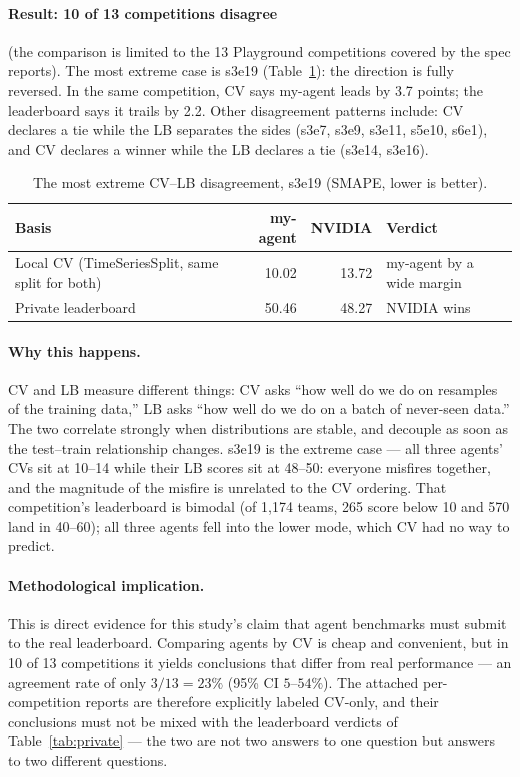 \documentclass[11pt,a4paper]{article}
\begin{document}
\paragraph{Result: 10 of 13 competitions disagree} (the comparison is limited to the 13 Playground competitions covered by the spec reports). The most extreme case is s3e19 (Table~\ref{tab:cvlb}): the direction is fully reversed. In the same competition, CV says my-agent leads by 3.7 points; the leaderboard says it trails by 2.2. Other disagreement patterns include: CV declares a tie while the LB separates the sides (s3e7, s3e9, s3e11, s5e10, s6e1), and CV declares a winner while the LB declares a tie (s3e14, s3e16).

\begin{table}[htbp]
\centering\small
\caption{The most extreme CV--LB disagreement, s3e19 (SMAPE, lower is better).}
\label{tab:cvlb}
\begin{tabular}{@{}lrrl@{}}
\toprule
\textbf{Basis} & \textbf{my-agent} & \textbf{NVIDIA} & \textbf{Verdict} \\
\midrule
Local CV (TimeSeriesSplit, same split for both) & 10.02 & 13.72 & my-agent by a wide margin \\
Private leaderboard & 50.46 & 48.27 & NVIDIA wins \\
\bottomrule
\end{tabular}
\end{table}

\paragraph{Why this happens.} CV and LB measure different things: CV asks ``how well do we do on resamples of the training data,'' LB asks ``how well do we do on a batch of never-seen data.'' The two correlate strongly when distributions are stable, and decouple as soon as the test--train relationship changes. s3e19 is the extreme case --- all three agents' CVs sit at 10--14 while their LB scores sit at 48--50: everyone misfires together, and the magnitude of the misfire is unrelated to the CV ordering. That competition's leaderboard is bimodal (of 1{,}174 teams, 265 score below 10 and 570 land in 40--60); all three agents fell into the lower mode, which CV had no way to predict.

\paragraph{Methodological implication.} This is direct evidence for this study's claim that agent benchmarks must submit to the real leaderboard. Comparing agents by CV is cheap and convenient, but in 10 of 13 competitions it yields conclusions that differ from real performance --- an agreement rate of only $3/13 = 23\%$ (95\% CI $5$--$54\%$). The attached per-competition reports are therefore explicitly labeled CV-only, and their conclusions must not be mixed with the leaderboard verdicts of Table~\ref{tab:private} --- the two are not two answers to one question but answers to two different questions.
\end{document}
